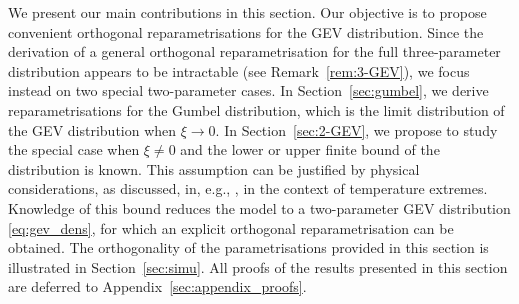 \documentclass{article}
\newcommand{\1}{\mathds{1}}
\theoremstyle{definition}
\begin{document}
We present our main contributions in this section. Our objective is to propose convenient orthogonal reparametrisations for the GEV distribution. Since the derivation of a general orthogonal reparametrisation for the full three-parameter distribution appears to be intractable (see Remark~\ref{rem:3-GEV}), we focus instead on two special two-parameter cases.
In Section~\ref{sec:gumbel}, we derive reparametrisations for the Gumbel distribution, which is the limit distribution of the GEV distribution when $\xi \rightarrow 0$.
In Section~\ref{sec:2-GEV}, we propose to study the special case when $\xi \ne 0$ and the lower or upper finite bound of the distribution is known. This assumption can be justified by physical considerations, as discussed, in, e.g., \cite{zhang2023upper}, in the context of temperature extremes.
Knowledge of this bound reduces the model to a two-parameter GEV distribution \eqref{eq:gev_dens}, for which an explicit orthogonal reparametrisation can be obtained. The orthogonality of the parametrisations provided in this section is illustrated in Section~\ref{sec:simu}. All proofs of the results presented in this section are deferred to Appendix~\ref{sec:appendix_proofs}.


\end{document}
